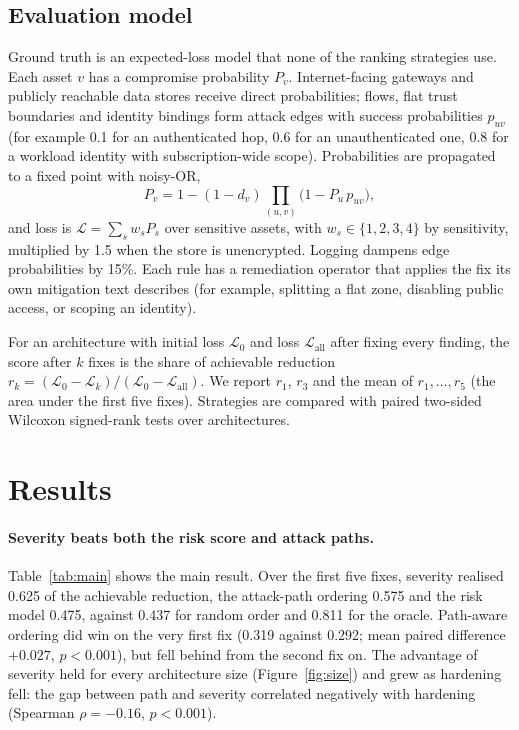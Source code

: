\documentclass[11pt]{article}
\begin{document}
\subsection{Evaluation model}
Ground truth is an expected-loss model that none of the ranking strategies use. Each asset \(v\) has a compromise probability \(P_v\).
Internet-facing gateways and publicly reachable data stores receive direct probabilities; flows, flat trust boundaries and identity
bindings form attack edges with success probabilities \(p_{uv}\) (for example 0.1 for an authenticated hop, 0.6 for an unauthenticated
one, 0.8 for a workload identity with subscription-wide scope). Probabilities are propagated to a fixed point with noisy-OR,
\[
  P_v = 1 - (1 - d_v)\prod_{(u,v)} \bigl(1 - P_u\, p_{uv}\bigr),
\]
and loss is \(\mathcal{L} = \sum_{s} w_s P_s\) over sensitive assets, with \(w_s \in \{1,2,3,4\}\) by sensitivity, multiplied by 1.5 when
the store is unencrypted. Logging dampens edge probabilities by 15\%. Each rule has a remediation operator that applies the fix its own
mitigation text describes (for example, splitting a flat zone, disabling public access, or scoping an identity).

For an architecture with initial loss \(\mathcal{L}_0\) and loss \(\mathcal{L}_{\text{all}}\) after fixing every finding, the score after
\(k\) fixes is the share of achievable reduction \(r_k = (\mathcal{L}_0 - \mathcal{L}_k)/(\mathcal{L}_0 - \mathcal{L}_{\text{all}})\).
We report \(r_1\), \(r_3\) and the mean of \(r_1,\dots,r_5\) (the area under the first five fixes). Strategies are compared with paired
two-sided Wilcoxon signed-rank tests \cite{wilcoxon1945} over architectures.

\section{Results}


\paragraph{Severity beats both the risk score and attack paths.}
Table~\ref{tab:main} shows the main result. Over the first five fixes, severity realised 0.625 of the achievable reduction, the attack-path
ordering 0.575 and the risk model 0.475, against 0.437 for random order and 0.811 for the oracle. Path-aware ordering did win on the very first
fix (0.319 against 0.292; mean paired difference \(+0.027\), \(p<0.001\)), but fell behind from the second fix on. The advantage of severity
held for every architecture size (Figure~\ref{fig:size}) and grew as hardening fell: the gap between path and severity correlated
negatively with hardening (Spearman \(\rho=-0.16\), \(p<0.001\)).
\end{document}
